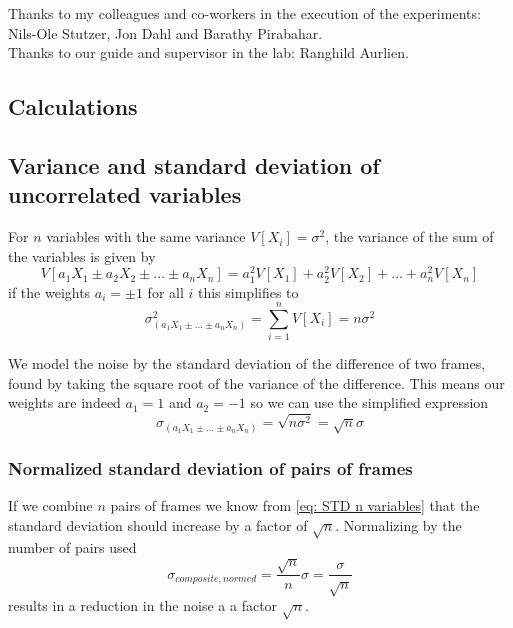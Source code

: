 \documentclass{emulateapj}
\begin{document}
\begin{acknowledgements}
  Thanks to my colleagues and co-workers in the execution of the experiments: Nils-Ole Stutzer, Jon Dahl and Barathy Pirabahar.\\
Thanks to our guide and supervisor in the lab: Ranghild Aurlien.
\end{acknowledgements}



\clearpage
\begin{appendices}
\section{Calculations}
\label{asec: Calculations}

\subsection{Variance and standard deviation of uncorrelated variables}
\label{asubsec: Var uncorrelated shown}
For $n$ variables with the same variance $V[X_i] = \sigma^2$, the variance of the sum of the variables \citep{STKbok} is given by
\begin{equation}
	V[a_1X_1 \pm a_2X_2 \pm \ldots \pm a_nX_n]  = a_1^2V[X_1] + a_2^2V[X_2] + \ldots + a_n^2V[X_n]
	\label{eq: Var n variables}
\end{equation}
if the weights $a_i = \pm 1$ for all $i$ this simplifies to
\begin{equation}
	\sigma_{(a_1X_1 \pm \ldots \pm a_nX_n)}^2 = \sum_{i=1}^n V[X_i]  = n \sigma^2
	\label{eq: Simplified Var n variables}
\end{equation}


We model the noise by the standard deviation of the difference of two frames, found by taking the square root of the variance of the difference. This means our weights are indeed $a_1=1$ and $a_2=-1$ so we can use the simplified expression
\begin{equation}
	\sigma_{(a_1X_1 \pm \ldots \pm a_nX_n)} = \sqrt{n\sigma^2} = \sqrt{n} \sigma
	\label{eq: STD n variables}
\end{equation}

\subsubsection{Normalized standard deviation of pairs of frames}
\label{asubsub: Normalized noise}
If we combine $n$ pairs of frames we know from \cref{eq: STD n variables} that the standard deviation should increase by a factor of $\sqrt{n}$. Normalizing by the number of pairs used
\begin{equation}
	\sigma_{composite, normed} =  \frac{\sqrt{n}}{n}\sigma = \frac{\sigma}{\sqrt{n}}
\end{equation}
results in a reduction in the noise a a factor $\sqrt{n}$.
\clearpage


\end{appendices}
\end{document}
